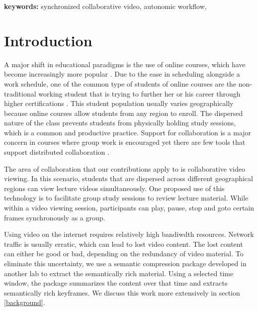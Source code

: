 \documentclass[10pt]{article}
\begin{document}

\textbf{keywords:} synchronized collaborative video, autonomic
workflow,


\section{Introduction} \label{intro}

A major shift in educational paradigms is the use of online courses,
which have become increasingly more popular \citep{BELLER,DOE}.  Due to
the ease in scheduling alongside a work schedule, one of the common
type of students of online courses are the non-traditional working
student that is trying to further her or his career through higher
certifications \citep{BURGESS:TRENDS}.  This student population usually
varies geographically because online courses allow students from any
region to enroll.  The dispersed nature of the class prevents students
from physically holding study sessions, which is a common and
productive practice.  Support for collaboration is a major concern in
courses where group work is encouraged \citep{WELLS:COLLAB} yet there
are few tools that support distributed collaboration
\citep{BURGESS:TRENDS}.

The area of collaboration that our contributions apply to is
collaborative video viewing.  In this scenario, students that are
dispersed across different geographical regions can view lecture
videos simultaneously.  One proposed use of this technology is to
facilitate group study sessions to review lecture material.  While
within a video viewing session, participants can play, pause, stop and
goto certain frames synchronously as a group.

Using video on the internet requires relatively high bandiwdth
resources.  Network traffic is usually erratic, which can lead to lost
video content.  The lost content can either be good or bad, depending
on the redundancy of video material.  To eliminate this uncertainty,
we use a semantic compression package \citep{TIECHENG} developed in
another lab to extract the semantically rich material.  Using a
selected time window, the package summarizes the content over that
time and extracts semantically rich keyframes.  We discuss this work
more extensively in section \ref{background}.
\end{document}
